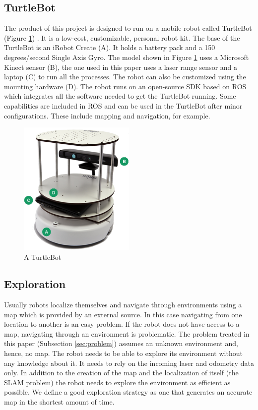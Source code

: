 \documentclass{ba-kecs}
\begin{document}
\subsection{TurtleBot}
\label{subsec:turtle}
The product of this project is designed to run on a mobile robot called TurtleBot (Figure \ref{fig:turtlebot}) \citep{turtlebot}. It is a low-cost, customizable, personal robot kit. The base of the TurtleBot is an iRobot Create (A). It holds a battery pack and a 150 degrees/second Single Axis Gyro. The model shown in Figure \ref{fig:turtlebot} uses a Microsoft Kinect sensor (B), the one used in this paper uses a laser range sensor and a laptop (C) to run all the processes. The robot can also be customized using the mounting hardware (D). The robot runs on an open-source SDK based on ROS which integrates all the software needed to get the TurtleBot running. Some capabilities are included in ROS and can be used in the TurtleBot after minor configurations. These include mapping and navigation, for example. 
\begin{figure}[h]
	\centering
		\includegraphics[width=0.50\textwidth]{figures/turtlebot.png}
	\caption{A TurtleBot}
	\label{fig:turtlebot}
\end{figure}

\subsection{Exploration}
\label{subsec:sotaExplore}
Usually robots localize themselves and navigate through environments using a map which is provided by an external source. In this case navigating from one location to another is an easy problem. If the robot does not have access to a map, navigating through an environment is problematic. The problem treated in this paper (Subsection \ref{sec:problem}) assumes an unknown environment and, hence, no map. The robot needs to be able to explore its environment without any knowledge about it. It needs to rely on the incoming laser and odometry data only. In addition to the creation of the map and the localization of itself (the SLAM problem) the robot needs to explore the environment as efficient as possible. We define a good exploration strategy as one that generates an accurate map in the shortest amount of time.
\end{document}

